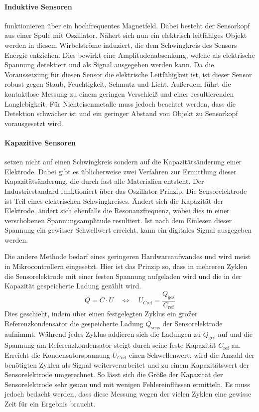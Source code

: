 \paragraph{Induktive Sensoren} funktionieren über ein hochfrequentes Magnetfeld. Dabei besteht der Sensorkopf
aus einer Spule mit Oszillator. Nähert sich nun ein elektrisch leitfähiges Objekt werden in diesem Wirbelströme
induziert, die dem Schwingkreis des Sensors Energie entziehen. Dies bewirkt eine Amplitudenabsenkung, welche als
elektrische Spannung detektiert und als Signal ausgegeben werden kann. Da die Voraussetzung für diesen Sensor
die elektrische Leitfähigkeit ist, ist dieser Sensor robust gegen Staub, Feuchtigkeit, Schmutz und Licht. Außerdem
führt die kontaktlose Messung zu einem geringen Verschleiß und einer resultierenden Langlebigkeit. Für
Nichteisenmetalle muss jedoch beachtet werden, dass die Detektion schwächer ist und ein geringer Abstand von Objekt
zu Sensorkopf vorausgesetzt wird.
%
\paragraph{Kapazitive Sensoren} setzen nicht auf einen Schwingkreis sondern auf die Kapazitätsänderung einer
Elektrode. Dabei gibt es üblicherweise zwei Verfahren zur Ermittlung dieser Kapazitätsänderung, die durch fast
alle Materialien entsteht. Der Industriestandard funktioniert über das Oszillator-Prinzip. Die Sensorelektrode
ist Teil eines elektrischen Schwingkreises. Ändert sich die Kapazität der Elektrode, ändert sich ebenfalls die Resonanzfrequenz,
wobei dies in einer verschobenen Spannungsamplitude resultiert. Ist nach dem Einlesen dieser Spannung ein gewisser Schwellwert erreicht, kann ein
digitales Signal ausgegeben werden. 

Die andere Methode bedarf eines geringeren Hardwareaufwandes und wird
meist in Mikrocontrollern eingesetzt. Hier ist das Prinzip so, dass in mehreren Zyklen die Sensorelektrode mit einer
festen Spannung aufgeladen wird und die in der Kapazität gespeicherte Ladung gezählt wird.
\begin{equation}
    Q = C \cdot U \quad \Leftrightarrow \quad U_{C\mathrm{ref}} = \frac{Q_\mathrm{ges}}{C_\mathrm{ref}}
    \label{eq:kapazitaet}
\end{equation}
Dies geschieht, indem über einen festgelegten Zyklus ein großer Referenzkondensator die gespeicherte Ladung $Q_\mathrm{sens}$ der Sensorelektrode aufnimmt.
Während jedes Zyklus addieren sich die Ladungen zu $Q_\mathrm{ges}$ auf und die Spannung am Referenzkondensator steigt durch seine feste Kapazität $C_\mathrm{ref}$ an.
Erreicht die Kondensatorspannung $U_{C\mathrm{ref}}$ einen Schwellenwert, wird die Anzahl der benötigten Zyklen als Signal weiterverarbeitet
und zu einem Kapazitätswert der Sensorelektrode umgerechnet.
So lässt sich die Größe der Kapazität der Sensorelektrode sehr genau und mit wenigen Fehlereinflüssen ermitteln.
Es muss jedoch bedacht werden, dass diese Messung wegen der vielen Zyklen eine gewisse Zeit für ein Ergebnis
braucht.
%
